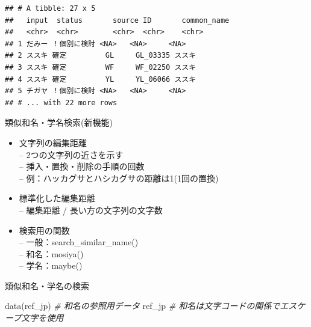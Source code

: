 \documentclass[
  a5paper,
  landscape,
  notitlepage]{report}
\newenvironment{Shaded}{\begin{snugshade}}{\end{snugshade}}
\newcommand{\CommentTok}[1]{\textcolor[rgb]{0.56,0.35,0.01}{\textit{#1}}}
\newcommand{\FunctionTok}[1]{\textcolor[rgb]{0.00,0.00,0.00}{#1}}
\newcommand{\NormalTok}[1]{#1}
\providecommand{\tightlist}{%
  \setlength{\itemsep}{0pt}\setlength{\parskip}{0pt}}
\begin{document}
\begin{verbatim}
## # A tibble: 27 x 5
##   input  status       source ID       common_name
##   <chr>  <chr>        <chr>  <chr>    <chr>      
## 1 だみー ！個別に検討 <NA>   <NA>     <NA>       
## 2 ススキ 確定         GL     GL_03335 ススキ     
## 3 ススキ 確定         WF     WF_02250 ススキ     
## 4 ススキ 確定         YL     YL_06066 ススキ     
## 5 チガヤ ！個別に検討 <NA>   <NA>     <NA>       
## # ... with 22 more rows
\end{verbatim}

\newpage

\fontsize{32pt}{32pt}\selectfont

\begin{center}
類似和名・学名検索(新機能)
\end{center}

\fontsize{24pt}{24pt}\selectfont

\begin{itemize}
\tightlist
\item
  文字列の編集距離\\
  -- 2つの文字列の近さを示す\\
  -- 挿入・置換・削除の手順の回数\\
  -- 例：ハッカグサとハシカグサの距離は1(1回の置換)\\
\item
  標準化した編集距離\\
  -- 編集距離 / 長い方の文字列の文字数
\item
  検索用の関数\\
  -- 一般：search\_similar\_name()\\
  -- 和名：mosiya()\\
  -- 学名：maybe()
\end{itemize}

\newpage

\fontsize{32pt}{32pt}\selectfont

\begin{center}
類似和名・学名の検索
\end{center}

\fontsize{16pt}{16pt}\selectfont

\begin{Shaded}
\begin{Highlighting}[]
\FunctionTok{data}\NormalTok{(ref\_jp)  }\CommentTok{\# 和名の参照用データ}
\NormalTok{ref\_jp        }\CommentTok{\# 和名は文字コードの関係でエスケープ文字を使用}
\end{Highlighting}
\end{Shaded}
\end{document}
